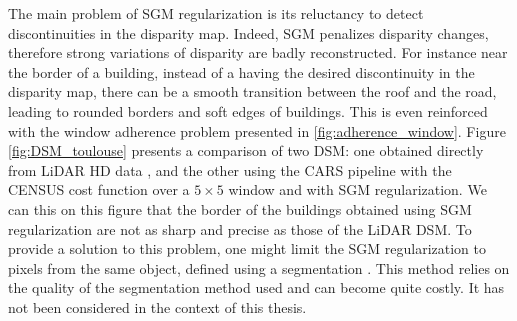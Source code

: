 The main problem of SGM regularization is its reluctancy to detect discontinuities in the disparity map. Indeed, SGM penalizes disparity changes, therefore strong variations of disparity are badly reconstructed. For instance near the border of a building, instead of a having the desired discontinuity in the disparity map, there can be a smooth transition between the roof and the road, leading to rounded borders and soft edges of buildings. This is even reinforced with the window adherence problem presented in \ref{fig:adherence_window}. Figure \ref{fig:DSM_toulouse} presents a comparison of two DSM: one obtained directly from LiDAR HD data \cite{monnet_lidarhd_2023}, and the other using the CARS pipeline with the CENSUS cost function over a $5\times5$ window and with SGM regularization. We can this on this figure that the border of the buildings obtained using SGM regularization are not as sharp and precise as those of the LiDAR DSM. To provide a solution to this problem, one might limit the SGM regularization to pixels from the same object, defined using a segmentation \cite{dumas_improving_2022}. This method relies on the quality of the segmentation method used and can become quite costly. It has not been considered in the context of this thesis. 

